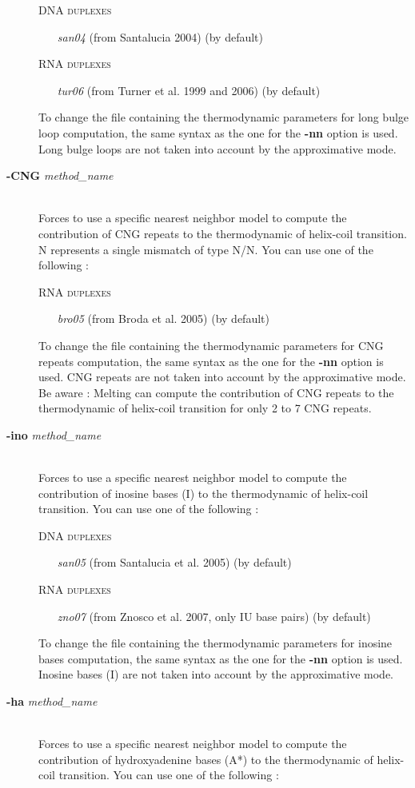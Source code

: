 \documentclass{article}
\begin{document}
\begin{description}
  \textsc{DNA duplexes}
    \begin{itemize}
    \item [\textit{san04}] (from Santalucia 2004) (by default)
    \end{itemize}
  \textsc{RNA duplexes}
    \begin{itemize}
    \item [\textit{tur06}] (from Turner et al. 1999 and 2006)  (by default) 			 			 
    \end{itemize}
  To change the file containing the thermodynamic parameters for long bulge loop computation, the same syntax as the one for the \textbf{-nn} option is used.
  Long bulge loops are not taken into account by the approximative mode.
\item [\textbf{-CNG} \textit{method\_name}]\mbox{}\\ 
  Forces to use a specific nearest neighbor model to compute the contribution of CNG repeats to the thermodynamic of helix-coil transition.
  N represents a single mismatch of type N/N. 
  You can use one of the following :
  
  \textsc{RNA duplexes}
    \begin{itemize}
    \item [\textit{bro05}] (from Broda et al. 2005) (by default)			 			 
    \end{itemize}
  To change the file containing the thermodynamic parameters for CNG repeats computation, the same syntax as the one for the \textbf{-nn} option is used.
  CNG repeats are not taken into account by the approximative mode. 
  Be aware : Melting can compute the contribution of CNG repeats to the thermodynamic of helix-coil transition for only 2 to 7 CNG repeats.
\item [\textbf{-ino} \textit{method\_name}]\mbox{}\\ 
  Forces to use a specific nearest neighbor model to compute the contribution of inosine bases (I) to the thermodynamic of helix-coil transition. 
  You can use one of the following :
  
  \textsc{DNA duplexes}
    \begin{itemize}
    \item [\textit{san05}] (from Santalucia et al. 2005)  (by default)
    \end{itemize}
  \textsc{RNA duplexes}
    \begin{itemize}
    \item [\textit{zno07}] (from Znosco et al. 2007, only IU base pairs)  (by default)  			 			 
    \end{itemize}
  To change the file containing the thermodynamic parameters for inosine bases computation, the same syntax as the one for the \textbf{-nn} option is used.
  Inosine bases (I) are not taken into account by the approximative mode. 
\item [\textbf{-ha} \textit{method\_name}]\mbox{}\\ 
  Forces to use a specific nearest neighbor model to compute the contribution of hydroxyadenine bases (A*) to the thermodynamic of helix-coil transition. 
  You can use one of the following :
  

\end{description}
\end{document}
